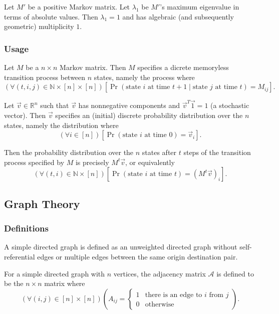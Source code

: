\documentclass[12pt, titlepage, twoside]{amsart}
\newcommand{\R}{\ensuremath{\mathbb R}}
\newcommand{\N}{\ensuremath{\mathbb N}}
\begin{document}
Let $M'$ be a positive Markov matrix.
Let $\lambda_1$ be $M'$'s maximum eigenvalue in terms of absolute values.
Then $\lambda_1 = 1$ and has algebraic (and subsequently geometric) multiplicity $1$.

\subsubsection{Usage}

Let $M$ be a $n\times n$ Markov matrix.
Then $M$ specifies a dicrete memoryless transition process between $n$ states, namely the process where
\[
  \left(\forall (t, i, j)\in\N\times[n]\times[n]\right)
  \left[\Pr(\text{state }i\text{ at time }t + 1\mid \text{state }j\text{ at time }t) = M_{ij}\right].
\]

Let $\vec{v}\in\R^n$ such that $\vec{v}$ has nonnegative components and $\vec{v}^T\vec{1} = 1$ (a stochastic vector).
Then $\vec{v}$ specifies an (initial) discrete probability distribution over the $n$ states, namely the distribution where
\[
  (\forall i\in[n])
  [\Pr(\text{state }i\text{ at time }0) = \vec{v}_i].
\]

Then the probability distribution over the $n$ states after $t$ steps of the transition process specified by $M$ is precisely $M^t\vec{v}$,
or equivalently
\[
  (\forall (t, i)\in\N\times[n])
  \left[\Pr(\text{state }i\text{ at time }t) = \left(M^t\vec{v}\right)_i\right].
\]

\subsection{Graph Theory}

\subsubsection{Definitions}

A simple directed graph is defined as an unweighted directed graph without self-referential edges or multiple edges
between the same origin destination pair.

For a simple directed graph with $n$ vertices, the adjacency matrix $\mathcal{A}$ is defined to be
the $n\times n$ matrix where
\[
  (\forall (i, j)\in[n]\times[n])\left(A_{ij} = 
    \begin{cases}
      1 & \text{there is an edge to $i$ from $j$} \\
      0 & \text{otherwise}
    \end{cases}
  \right).
\]
\end{document}
